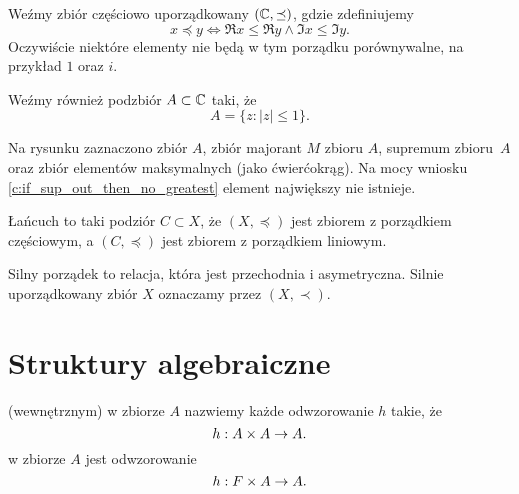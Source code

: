 \documentclass[11pt]{scrartcl}
\begin{document}
    \begin{example}
        Weźmy zbiór częściowo uporządkowany $(\mathbb C, \preceq)$, gdzie zdefiniujemy
        $$ x \preceq y \iff \Re{x} \leq \Re{y} \wedge \Im{x} \leq \Im{y}. $$
        Oczywiście niektóre elementy nie będą w tym porządku porównywalne, na przykład $1$ oraz $i$.

        Weźmy również podzbiór $A \subset \mathbb C$ taki, że
        $$ A = \{z : |z| \leq 1\}. $$

        Na rysunku zaznaczono \textcolor{MainColor1}{zbiór $A$}, \textcolor{LinkColor1}{zbiór majorant $M$ zbioru $A$}, \textcolor{BoxColor1}{supremum zbioru~$A$} oraz \textcolor{MainColor1}{zbiór elementów maksymalnych} (jako ćwierćokrąg). Na mocy wniosku \ref{c:if_sup_out_then_no_greatest} element największy nie istnieje.

        \begin{center}
        \end{center}
    \end{example}

    \begin{definition}
        Łańcuch to taki podziór $C \subset X$, że $(X, \preceq)$ jest zbiorem z porządkiem częściowym, a $(C, \preceq)$ jest zbiorem z porządkiem liniowym.
    \end{definition}

    \begin{definition}
        Silny porządek to relacja, która jest przechodnia i asymetryczna. Silnie uporządkowany zbiór $X$ oznaczamy przez $(X, \prec)$.
    \end{definition}

    \section{Struktury algebraiczne}
     (wewnętrznym) w zbiorze $A$ nazwiemy każde odwzorowanie $h$ takie, że
    $$ h : A \times A \rightarrow A. $$
     w zbiorze $A$ jest odwzorowanie
    $$ h : F \times A \rightarrow A. $$
\end{document}
